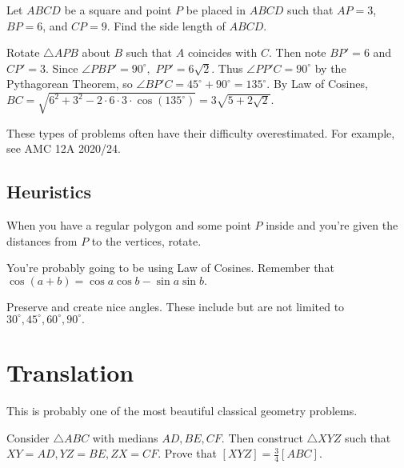 \documentclass{article}
\begin{document}
\begin{exam}
Let $ABCD$ be a square and point $P$ be placed in $ABCD$ such that $AP=3$, $BP=6$, and $CP=9$. Find the side length of $ABCD.$
\end{exam}

\begin{sol}
Rotate $\triangle APB$ about $B$ such that $A$ coincides with $C.$ Then note $BP'=6$ and $CP'=3.$ Since $\angle PBP'=90^{\circ},$ $PP'=6\sqrt{2}.$ Thus $\angle PP'C=90^{\circ}$ by the Pythagorean Theorem, so $\angle BP'C=45^{\circ}+90^{\circ}=135^{\circ}.$ By Law of Cosines, $BC=\sqrt{6^2+3^2-2\cdot 6\cdot 3\cdot \cos(135^{\circ})}=3\sqrt{5+2\sqrt{2}}.$
\end{sol}

These types of problems often have their difficulty overestimated. For example, see AMC 12A 2020/24.

\subsection{Heuristics}
\begin{itemize}
\Item When you have a regular polygon and some point $P$ inside and you're given the distances from $P$ to the vertices, rotate.

\Item You're probably going to be using Law of Cosines. Remember that $\cos(a+b)=\cos a\cos b-\sin a\sin b.$

\Item Preserve and create nice angles. These include but are not limited to $30^{\circ},45^{\circ},60^{\circ},90^{\circ}.$
\end{itemize}

\section{Translation}
This is probably one of the most beautiful classical geometry problems.

\begin{exam}
Consider $\triangle ABC$ with medians $AD,BE,CF.$ Then construct $\triangle XYZ$ such that $XY=AD,YZ=BE,ZX=CF.$ Prove that $[XYZ]=\frac{3}{4}[ABC].$
\end{exam}
\end{document}
